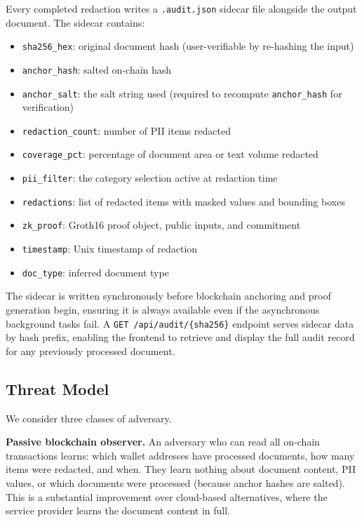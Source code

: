 \documentclass[conference]{IEEEtran}
\begin{document}
Every completed redaction writes a
\texttt{.audit.json} sidecar file alongside the
output document.
The sidecar contains:

\begin{itemize}
  \item \texttt{sha256\_hex}: original document hash
        (user-verifiable by re-hashing the input)
  \item \texttt{anchor\_hash}: salted on-chain hash
  \item \texttt{anchor\_salt}: the salt string used
        (required to recompute \texttt{anchor\_hash}
        for verification)
  \item \texttt{redaction\_count}: number of PII
        items redacted
  \item \texttt{coverage\_pct}: percentage of document
        area or text volume redacted
  \item \texttt{pii\_filter}: the category selection
        active at redaction time
  \item \texttt{redactions}: list of redacted items
        with masked values and bounding boxes
  \item \texttt{zk\_proof}: Groth16 proof object,
        public inputs, and commitment
  \item \texttt{timestamp}: Unix timestamp of
        redaction
  \item \texttt{doc\_type}: inferred document type
\end{itemize}

The sidecar is written synchronously before
blockchain anchoring and proof generation begin,
ensuring it is always available even if the
asynchronous background tasks fail.
A \texttt{GET /api/audit/\{sha256\}} endpoint serves
sidecar data by hash prefix, enabling the frontend
to retrieve and display the full audit record
for any previously processed document.

\subsection{Threat Model}

We consider three classes of adversary.

\textbf{Passive blockchain observer.}
An adversary who can read all on-chain transactions
learns: which wallet addresses have processed
documents, how many items were redacted, and when.
They learn nothing about document content, PII
values, or which documents were processed (because
anchor hashes are salted).
This is a substantial improvement over cloud-based
alternatives, where the service provider learns
the document content in full.
\end{document}
